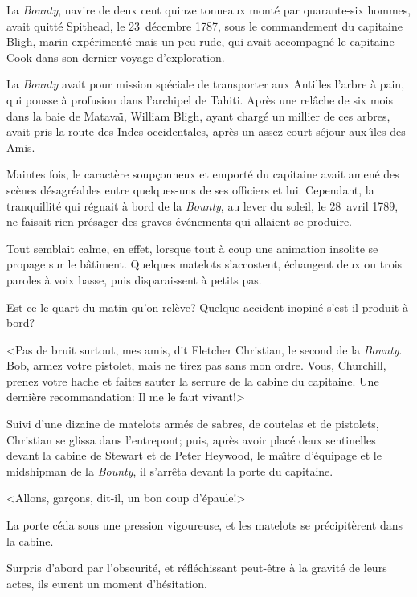 La {\sl Bounty}, navire de deux cent quinze tonneaux
mont\'e par quarante-six hommes, avait quitt\'e Spithead,
le 23~d\'ecembre 1787, sous le commandement du capitaine Bligh,
marin exp\'eriment\'e mais un peu rude, qui avait accompagn\'e
le capitaine Cook dans son dernier voyage d'exploration.

La {\sl Bounty\/} avait pour mission sp\'eciale de transporter
aux Antilles l'arbre \`a pain, qui pousse \`a profusion dans
l'archipel de Tahiti. Apr\`es une rel\^ache de six mois dans
la baie de Matava\"\i, William Bligh, ayant charg\'e un millier
de ces arbres, avait pris la route des Indes occidentales,
apr\`es un assez court s\'ejour aux {\^\i}les des Amis.

Maintes fois, le caract\`ere soup\c{c}onneux et emport\'e
du capitaine avait amen\'e des sc\`enes d\'esagr\'eables
entre quelques-uns de ses officiers et lui. Cependant,
la tranquillit\'e qui r\'egnait \`a bord de la {\sl Bounty\/},
au lever du soleil, le 28~avril 1789, ne faisait rien
pr\'esager des graves \'ev\'enements qui allaient se produire.

Tout semblait calme, en effet, lorsque tout \`a coup
une animation insolite se propage sur le b\^atiment.
Quelques matelots s'accostent, \'echangent deux ou trois
paroles \`a voix basse, puis disparaissent \`a petits pas.

Est-ce le quart du matin qu'on rel\`eve?
Quelque accident inopin\'e s'est-il produit \`a bord?

<Pas de bruit surtout, mes amis, dit Fletcher Christian,
le second de la {\sl Bounty}. Bob, armez votre pistolet,
mais ne tirez pas sans mon ordre. Vous, Churchill, prenez
votre hache et faites sauter la serrure de la cabine du capitaine.
Une derni\`ere recommandation: Il me le faut vivant!>

Suivi d'une dizaine de matelots arm\'es de sabres,
de coutelas et de pistolets, Christian se glissa dans
l'entrepont; puis, apr\`es avoir plac\'e deux
sentinelles devant la cabine de Stewart et de Peter Heywood,
le ma{\^\i}tre d'\'equipage et le midshipman de la
{\sl Bounty}, il s'arr\^eta devant la porte du capitaine.

<Allons, gar\c{c}ons, dit-il, un bon coup d'\'epaule!>

La porte c\'eda sous une pression vigoureuse,
et les matelots se pr\'ecipit\`erent dans la cabine.

Surpris d'abord par l'obscurit\'e,
et r\'efl\'echissant peut-\^etre
\`a la gravit\'e de leurs actes,
ils eurent un moment d'h\'esitation.

